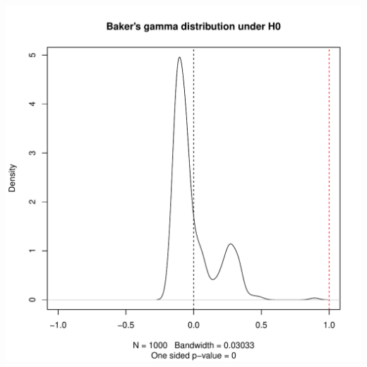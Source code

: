 \documentclass[shortnames,nojss,article]{jss}\usepackage[]{graphicx}\usepackage[]{color}
\makeatletter
\def\maxwidth{ %
  \ifdim\Gin@nat@width>\linewidth
    \linewidth
  \else
    \Gin@nat@width
  \fi
}
\newenvironment{knitrout}{}{} %
\makeatother
\begin{document}
\begin{knitrout}
{\centering \includegraphics[width=\maxwidth]{figure/cor_bakers_gamma_simulation_1} 

}



\end{knitrout}
\end{document}
